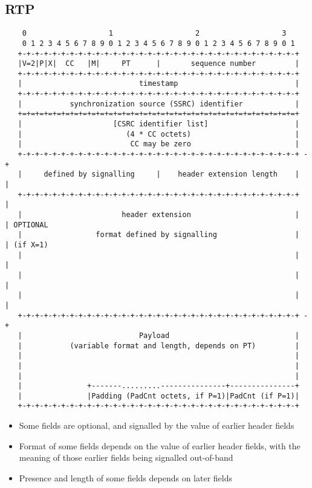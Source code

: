 \documentclass[10pt]{article}
\begin{document}
\subsection{RTP}

\footnotesize
\begin{verbatim}
    0                   1                   2                   3
    0 1 2 3 4 5 6 7 8 9 0 1 2 3 4 5 6 7 8 9 0 1 2 3 4 5 6 7 8 9 0 1
   +-+-+-+-+-+-+-+-+-+-+-+-+-+-+-+-+-+-+-+-+-+-+-+-+-+-+-+-+-+-+-+-+
   |V=2|P|X|  CC   |M|     PT      |       sequence number         |
   +-+-+-+-+-+-+-+-+-+-+-+-+-+-+-+-+-+-+-+-+-+-+-+-+-+-+-+-+-+-+-+-+
   |                           timestamp                           |
   +-+-+-+-+-+-+-+-+-+-+-+-+-+-+-+-+-+-+-+-+-+-+-+-+-+-+-+-+-+-+-+-+
   |           synchronization source (SSRC) identifier            |
   +=+=+=+=+=+=+=+=+=+=+=+=+=+=+=+=+=+=+=+=+=+=+=+=+=+=+=+=+=+=+=+=+
   |                     [CSRC identifier list]                    |
   |                        (4 * CC octets)                        |
   |                         CC may be zero                        |
   +-+-+-+-+-+-+-+-+-+-+-+-+-+-+-+-+-+-+-+-+-+-+-+-+-+-+-+-+-+-+-+-+ -+
   |     defined by signalling     |    header extension length    |  |
   +-+-+-+-+-+-+-+-+-+-+-+-+-+-+-+-+-+-+-+-+-+-+-+-+-+-+-+-+-+-+-+-+  |
   |                       header extension                        |  | OPTIONAL
   |                 format defined by signalling                  |  | (if X=1)
   |                                                               |  |
   |                                                               |  |
   |                                                               |  |
   +-+-+-+-+-+-+-+-+-+-+-+-+-+-+-+-+-+-+-+-+-+-+-+-+-+-+-+-+-+-+-+-+ -+
   |                           Payload                             |
   |           (variable format and length, depends on PT)         |
   |                                                               |
   |                                                               |
   |                                                               |
   |               +-------.........---------------+---------------+
   |               |Padding (PadCnt octets, if P=1)|PadCnt (if P=1)|
   +-+-+-+-+-+-+-+-+-+-+-+-+-+-+-+-+-+-+-+-+-+-+-+-+-+-+-+-+-+-+-+-+
\end{verbatim}
\normalsize

\begin{itemize}
  \item Some fields are optional, and signalled by the value of earlier 
        header fields
  \item Format of some fields depends on the value of earlier header fields,
        with the meaning of those earlier fields being signalled out-of-band
  \item Presence and length of some fields depends on later fields
\end{itemize}
\end{document}
